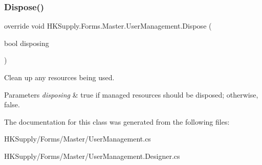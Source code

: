 \subsubsection{\texorpdfstring{Dispose()}{Dispose()}}
{\footnotesize\ttfamily override void H\+K\+Supply.\+Forms.\+Master.\+User\+Management.\+Dispose (\begin{DoxyParamCaption}\item[{bool}]{disposing }\end{DoxyParamCaption})\hspace{0.3cm}{\ttfamily [protected]}}



Clean up any resources being used. 


\begin{DoxyParams}{Parameters}
{\em disposing} & true if managed resources should be disposed; otherwise, false.\\
\hline
\end{DoxyParams}


The documentation for this class was generated from the following files\+:\begin{DoxyCompactItemize}
\item 
H\+K\+Supply/\+Forms/\+Master/User\+Management.\+cs\item 
H\+K\+Supply/\+Forms/\+Master/User\+Management.\+Designer.\+cs\end{DoxyCompactItemize}
